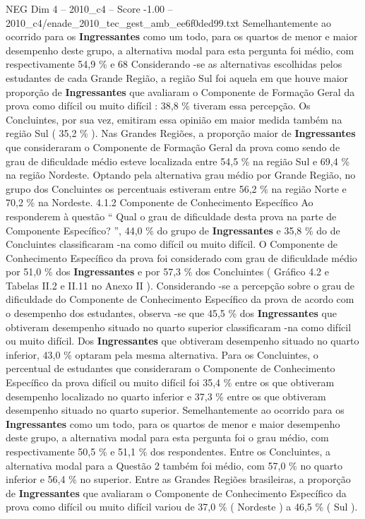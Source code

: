 \begin{textsample}{NEG Dim 4 – 2010\_c4 – Score -1.00 – 2010\_c4/enade\_2010\_tec\_gest\_amb\_ee6f0ded99.txt}
Semelhantemente ao ocorrido para os \textbf{Ingressantes} como um todo, para os quartos de menor e maior desempenho deste grupo, a alternativa modal para esta pergunta foi médio, com respectivamente 54,9 \% e 68 Considerando -se as alternativas escolhidas pelos estudantes de cada Grande Região, a região Sul foi aquela em que houve maior proporção de \textbf{Ingressantes} que avaliaram o Componente de Formação Geral da prova como difícil ou muito difícil : 38,8 \% tiveram essa percepção.
Os Concluintes, por sua vez, emitiram essa opinião em maior medida também na região Sul ( 35,2 \% ).
Nas Grandes Regiões, a proporção maior de \textbf{Ingressantes} que consideraram o Componente de Formação Geral da prova como sendo de grau de dificuldade médio esteve localizada entre 54,5 \% na região Sul e 69,4 \% na região Nordeste.
Optando pela alternativa grau médio por Grande Região, no grupo dos Concluintes os percentuais estiveram entre 56,2 \% na região Norte e 70,2 \% na Nordeste. 4.1.2 Componente de Conhecimento Específico Ao responderem à questão “ Qual o grau de dificuldade desta prova na parte de Componente Específico? ”, 44,0 \% do grupo de \textbf{Ingressantes} e 35,8 \% do de Concluintes classificaram -na como difícil ou muito difícil.
O Componente de Conhecimento Específico da prova foi considerado com grau de dificuldade médio por 51,0 \% dos \textbf{Ingressantes} e por 57,3 \% dos Concluintes ( Gráfico 4.2 e Tabelas II.2 e II.11 no Anexo II ).
Considerando -se a percepção sobre o grau de dificuldade do Componente de Conhecimento Específico da prova de acordo com o desempenho dos estudantes, observa -se que 45,5 \% dos \textbf{Ingressantes} que obtiveram desempenho situado no quarto superior classificaram -na como difícil ou muito difícil.
Dos \textbf{Ingressantes} que obtiveram desempenho situado no quarto inferior, 43,0 \% optaram pela mesma alternativa.
Para os Concluintes, o percentual de estudantes que consideraram o Componente de Conhecimento Específico da prova difícil ou muito difícil foi 35,4 \% entre os que obtiveram desempenho localizado no quarto inferior e 37,3 \% entre os que obtiveram desempenho situado no quarto superior.
Semelhantemente ao ocorrido para os \textbf{Ingressantes} como um todo, para os quartos de menor e maior desempenho deste grupo, a alternativa modal para esta pergunta foi o grau médio, com respectivamente 50,5 \% e 51,1 \% dos respondentes.
Entre os Concluintes, a alternativa modal para a Questão 2 também foi médio, com 57,0 \% no quarto inferior e 56,4 \% no superior.
Entre as Grandes Regiões brasileiras, a proporção de \textbf{Ingressantes} que avaliaram o Componente de Conhecimento Específico da prova como difícil ou muito difícil variou de 37,0 \% ( Nordeste ) a 46,5 \% ( Sul ).

\end{textsample}
